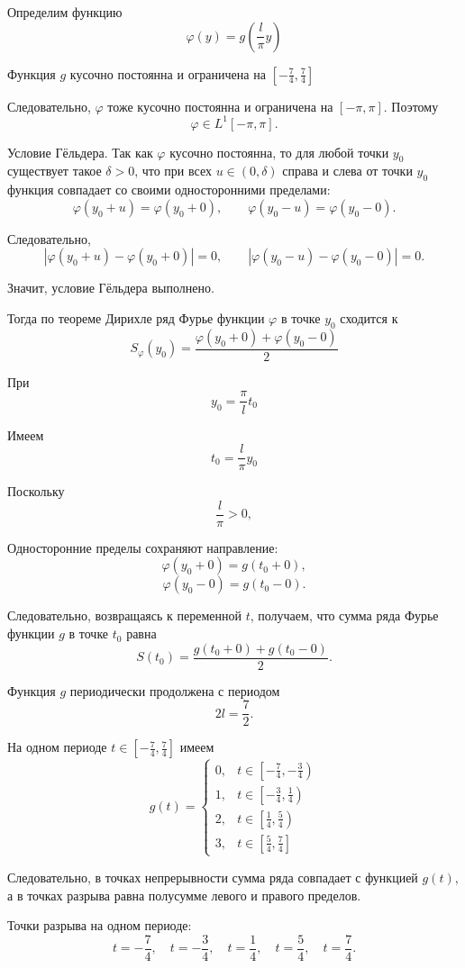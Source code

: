 \documentclass[12pt,a4paper]{article}
\begin{document}
Определим функцию
\[
\varphi(y)=g\left(\frac{l}{\pi}y\right)
\]

Функция \(g\) кусочно постоянна и ограничена на $\left[-\frac74,\frac74\right]$

Следовательно, \(\varphi\) тоже кусочно постоянна и ограничена
на \([-\pi,\pi]\). Поэтому
\[
\varphi\in L^1[-\pi,\pi].
\]

Условие Гёльдера. Так как \(\varphi\) кусочно постоянна, то для любой точки \(y_0\)
существует такое \(\delta>0\), что при всех \(u\in(0,\delta)\)
справа и слева от точки \(y_0\) функция совпадает со своими
односторонними пределами:
\[
\varphi(y_0+u)=\varphi(y_0+0),
\qquad
\varphi(y_0-u)=\varphi(y_0-0).
\]

Следовательно,
\[
|\varphi(y_0+u)-\varphi(y_0+0)|=0,
\qquad
|\varphi(y_0-u)-\varphi(y_0-0)|=0.
\]

Значит, условие Гёльдера выполнено.

Тогда по теореме Дирихле ряд Фурье функции \(\varphi\) в точке \(y_0\) сходится к
\[
S_\varphi(y_0) = \frac{\varphi(y_0+0)+\varphi(y_0-0)}{2}
\]

При
\[
y_0=\frac{\pi}{l}t_0
\]

Имеем
\[
t_0=\frac{l}{\pi}y_0
\]

Поскольку
\[
\frac{l}{\pi}>0,
\]

Односторонние пределы сохраняют направление:
\[
\varphi(y_0+0)
=
g(t_0+0),
\]
\[
\varphi(y_0-0)
=
g(t_0-0).
\]

Следовательно, возвращаясь к переменной \(t\), получаем, что сумма ряда
Фурье функции \(g\) в точке \(t_0\) равна
\[
S(t_0)=
\frac{g(t_0+0)+g(t_0-0)}{2}.
\]

Функция \(g\) периодически продолжена с периодом
\[
2l=\frac72.
\]

На одном периоде $t\in\left[-\frac74,\frac74\right]$ имеем
\[
g(t)=
\begin{cases}
0, & t\in\left[-\frac74,-\frac34\right)\\[2mm]
1, & t\in\left[-\frac34,\frac14\right)\\[2mm]
2, & t\in\left[\frac14,\frac54\right)\\[2mm]
3, & t\in\left[\frac54,\frac74\right]
\end{cases}
\]

Следовательно, в точках непрерывности сумма ряда совпадает с функцией
\(g(t)\), а в точках разрыва равна полусумме левого и правого пределов.

Точки разрыва на одном периоде:
\[
t=-\frac74,\quad t=-\frac34,\quad t=\frac14,\quad t=\frac54,\quad t=\frac74.
\]
\end{document}
